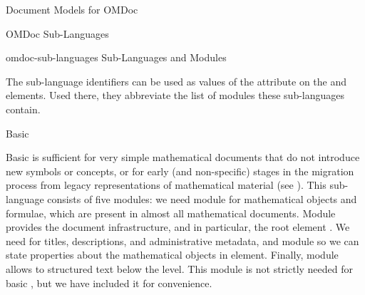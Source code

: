 \begin{tchapter}[id=document-model]{Document Models for OMDoc}
\begin{tsection}[id=sub-languages]{OMDoc Sub-Languages}
\begin{myfig}{omdoc-sub-languages}{{\omdoc} Sub-Languages and Modules}
\end{myfig}

The sub-language identifiers can be used as values of the {}
attribute on the {} and {} elements. Used there, they
abbreviate the list of modules these sub-languages contain.

\begin{tsubsection}[id=sub-languages:basic]{Basic {\omdoc}}
  
  Basic {\omdoc} is sufficient for very simple mathematical documents that do not
  introduce new symbols or concepts, or for early (and non-specific) stages in the
  migration process from legacy representations of mathematical material (see
  {}).  This {\omdoc} sub-language consists of five modules: we need
  module {} for mathematical objects and formulae, which are present in
  almost all mathematical documents. Module {} provides the document
  infrastructure, and in particular, the root element
  {}. We need {} for titles, descriptions, and
  administrative metadata, and module {} so we can state properties about
  the mathematical objects in {} element. Finally, module
  {} allows to structured text below the {} level.  This
  module is not strictly needed for basic {\omdoc}, but we have included it for
  convenience.
\end{tsubsection}


\end{tsection}
\end{tchapter}

